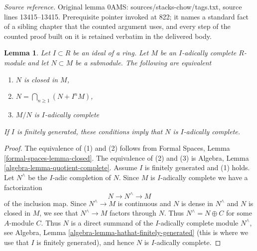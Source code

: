 \documentclass[10pt,a4paper]{amsart}
\theoremstyle{plain}
\newtheorem{lemma}[subsection]{Lemma}
\theoremstyle{definition}
\theoremstyle{remark}
\numberwithin{equation}{subsection}
\begin{document}
\noindent\textit{Source reference.} Original lemma 0AMS: sources/stacks-chow/tags.txt, source lines 13415--13415. Prerequisite pointer invoked at 822; it names a standard fact of a sibling chapter that the counted argument uses, and every step of the counted proof built on it is retained verbatim in the delivered body.\par\medskip
\begin{lemma}
\label{lemma-closed-is-complete}
Let $I \subset R$ be an ideal of a ring. Let $M$ be an $I$-adically complete
$R$-module and let $N \subset M$ be a submodule. The following are equivalent
\begin{enumerate}
\item $N$ is closed in $M$,
\item $N = \bigcap_{n \geq 1} (N + I^n M)$,
\item $M/N$ is $I$-adically complete
\end{enumerate}
If $I$ is finitely generated, these conditions imply that $N$
is $I$-adically complete.
\end{lemma}

\begin{proof}
The equivalence of (1) and (2) follows from
Formal Spaces, Lemma \ref{formal-spaces-lemma-closed}.
The equivalence of (2) and (3) is
Algebra, Lemma \ref{algebra-lemma-quotient-complete}.
Assume $I$ is finitely generated and (1) holds.
Let $N^\wedge$ be the $I$-adic completion of $N$. Since $M$
is $I$-adically complete we have a factorization
$$
N \to N^\wedge \to M
$$
of the inclusion map. Since $N^\wedge \to M$ is continuous and
$N$ is dense in $N^\wedge$ and $N$ is closed in $M$, we see that
$N^\wedge \to M$ factors through $N$. Thus $N^\wedge = N \oplus C$
for some $A$-module $C$. Thus $N$ is a direct summand of the
$I$-adically complete module $N^\wedge$, see
Algebra, Lemma \ref{algebra-lemma-hathat-finitely-generated}
(this is where we use that $I$ is finitely generated),
and hence $N$ is $I$-adically complete.
\end{proof}
\end{document}
